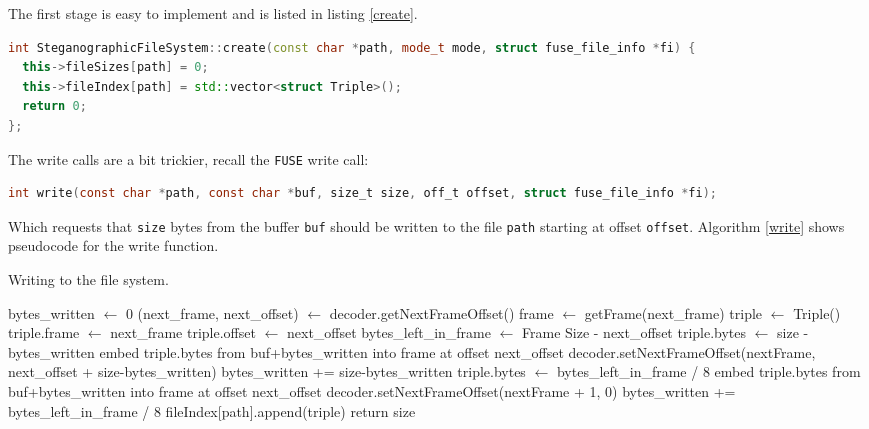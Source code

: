 \documentclass[paper=a4, fontsize=11pt,twoside]{scrartcl}    %
\numberwithin{table}{section}
\numberwithin{figure}{section}
\numberwithin{algorithm}{section}
\begin{document}
The first stage is easy to implement and is listed in listing \ref{create}.

\begin{lstlisting}[language=C++, caption={The \texttt{create} function call (\texttt{fs/stegfs.cc:202}).}, frame=single, label=create]
int SteganographicFileSystem::create(const char *path, mode_t mode, struct fuse_file_info *fi) {
  this->fileSizes[path] = 0;
  this->fileIndex[path] = std::vector<struct Triple>();
  return 0;
};
\end{lstlisting}

\noindent
The write calls are a bit trickier, recall the \texttt{FUSE} write call:

\begin{lstlisting}[language=C, caption={\texttt{FUSE} write operation.}, frame=single]
int write(const char *path, const char *buf, size_t size, off_t offset, struct fuse_file_info *fi);
\end{lstlisting}

\noindent
Which requests that \texttt{size} bytes from the buffer \texttt{buf} should be written to the file \texttt{path} starting at offset \texttt{offset}. Algorithm \ref{write} shows pseudocode for the write function.

\begin{algorithm}[!h]
\caption{Writing to the file system.}
\label{write}
\begin{algorithmic}[1]
\State bytes\_written $\gets$ 0
	\State (next\_frame, next\_offset) $\gets$ decoder.getNextFrameOffset()
	\State frame $\gets$ getFrame(next\_frame)
	\State triple $\gets$ Triple()
	\State triple.frame $\gets$ next\_frame
	\State triple.offset $\gets$ next\_offset
	\State bytes\_left\_in\_frame $\gets$ Frame Size - next\_offset
		\State		
		\State triple.bytes $\gets$ size - bytes\_written
		\State embed triple.bytes from buf+bytes\_written into frame at offset next\_offset
		\State decoder.setNextFrameOffset(nextFrame, next\_offset + size-bytes\_written)
		\State bytes\_written += size-bytes\_written
	\Else
		\State		
		\State triple.bytes $\gets$ bytes\_left\_in\_frame / 8
		\State embed triple.bytes from buf+bytes\_written into frame at offset next\_offset
		\State decoder.setNextFrameOffset(nextFrame + 1, 0)
		\State bytes\_written += bytes\_left\_in\_frame / 8
	\EndIf
	\State fileIndex[path].append(triple)
\EndWhile
\State return size
\end{algorithmic}
\end{algorithm}
\end{document}
